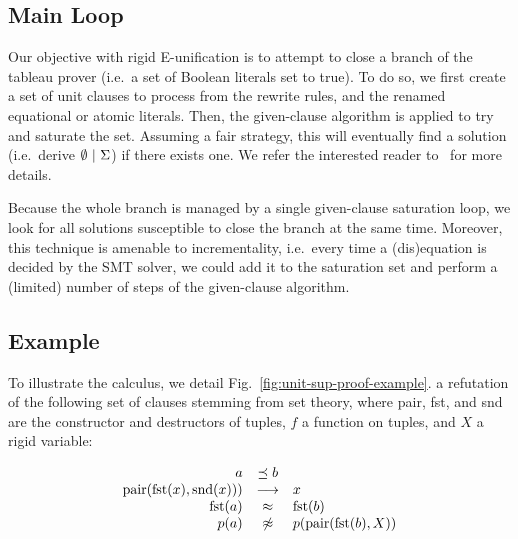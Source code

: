 \subsection{Main Loop}

Our objective with rigid E-unification is to attempt to close a branch of the
tableau prover (i.e.~a set of Boolean literals set to true). To do so, we first
create a set of unit clauses to process from the rewrite rules, and the renamed
equational or atomic literals. Then, the given-clause algorithm is applied to try and
saturate the set. Assuming a fair strategy, this will eventually find a
solution (i.e.~derive $\emptyset ~|~ \Sigma$) if there exists
one. We refer the interested reader to~\cite{SS02} for more details.

Because the whole branch is managed by a single given-clause saturation loop, we
look for all solutions susceptible to close the branch at the same time.
Moreover, this technique is amenable to incrementality, i.e.~every time a
(dis)equation is decided by the SMT solver, we could add it to the saturation
set and perform a (limited) number of steps of the given-clause algorithm.

\subsection{Example}

To illustrate the calculus, we detail Fig.~\ref{fig:unit-sup-proof-example}.
a refutation of the following set of
clauses stemming from set theory, where pair, fst, and snd are the constructor
and destructors of tuples, $f$ a function on tuples, and $X$ a rigid variable:

\[\begin{array}{rcl}
a &\preceq b \\
\text{pair}(\text{fst}(x), \text{snd}(x))) &\longrightarrow& x\\
\text{fst}(a) &\approx& \text{fst}(b)\\
p(a) &\not\approx& p(\text{pair}(\text{fst}(b), X))\\
\end{array}\]

